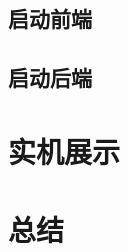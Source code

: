 \documentclass[UTF8]{ctexart}
\begin{document}
\subsection{启动前端}

\subsection{启动后端}

\section{实机展示}

\section{总结}
\end{document}
